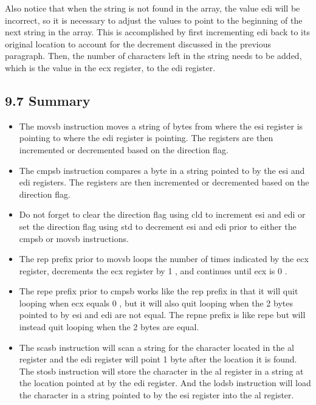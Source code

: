 \documentclass[10pt]{article}
\begin{document}
Also notice that when the string is not found in the array, the value edi will be incorrect, so it is necessary to adjust the values to point to the beginning of the next string in the array. This is accomplished by first incrementing edi back to its original location to account for the decrement discussed in the previous paragraph. Then, the number of characters left in the string needs to be added, which is the value in the ecx register, to the edi register.

\subsection*{9.7 Summary}
\begin{itemize}
  \item The movsb instruction moves a string of bytes from where the esi register is pointing to where the edi register is pointing. The registers are then incremented or decremented based on the direction flag.
  \item The cmpsb instruction compares a byte in a string pointed to by the esi and edi registers. The registers are then incremented or decremented based on the direction flag.
  \item Do not forget to clear the direction flag using cld to increment esi and edi or set the direction flag using std to decrement esi and edi prior to either the cmpsb or movsb instructions.
  \item The rep prefix prior to movsb loops the number of times indicated by the ecx register, decrements the ecx register by 1 , and continues until ecx is 0 .
  \item The repe prefix prior to cmpsb works like the rep prefix in that it will quit looping when ecx equals 0 , but it will also quit looping when the 2 bytes pointed to by esi and edi are not equal. The repne prefix is like repe but will instead quit looping when the 2 bytes are equal.
  \item The scasb instruction will scan a string for the character located in the al register and the edi register will point 1 byte after the location it is found. The stosb instruction will store the character in the al register in a string at the location pointed at by the edi register. And the lodsb instruction will load the character in a string pointed to by the esi register into the al register.
\end{itemize}
\end{document}
